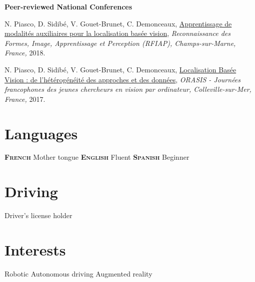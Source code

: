 \documentclass[]{friggeri-cv}
\begin{document}
	\vspace{0.5cm}
    \textbf{Peer-reviewed National Conferences} 
    
    {\footnotesize{N. Piasco, D. Sidibé, V. Gouet-Brunet, C. Demonceaux, \href{https://rfiap2018.ign.fr/sites/default/files/ARTICLES/RFIAP_2018/RFIAP_2018_Piasco_Apprentissage.pdf}{\textcolor{pblue}{Apprentissage de modalités auxiliaires pour la localisation basée vision}},
\textit{Reconnaissance des Formes, Image, Apprentissage et Perception (RFIAP), Champs-sur-Marne, France,} 2018.}

\footnotesize{N. Piasco, D. Sidibé, V. Gouet-Brunet, C. Demonceaux, \href{http://recherche.ign.fr/labos/matis/img/ic_pdf.gif}{\textcolor{pblue}{Localisation Basée Vision : de l’hétérogénéité des approches et des données}},
\textit{ORASIS - Journées francophones des jeunes chercheurs en vision par ordinateur, Colleville-sur-Mer, France,} 2017.}}
    


% 

\begin{asidep2}
  \section{Languages}
    \textbf{\textsc{French}}
    Mother tongue
    \textbf{\textsc{English}}
    Fluent
    \textbf{\textsc{Spanish}}
    Beginner  
  \section{Driving}
    Driver's license holder
  \section{Interests}
  Robotic
  Autonomous driving    
  Augmented reality  
\end{asidep2}
\end{document}
